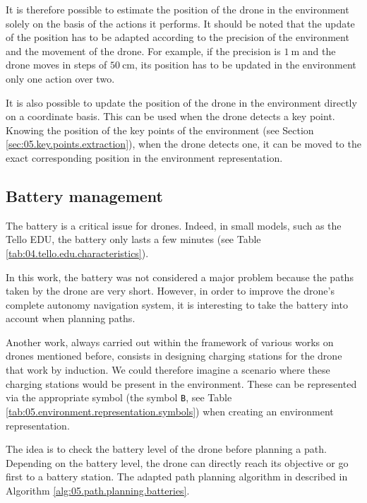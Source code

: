 It is therefore possible to estimate the position of the drone in the environment solely on the basis of the actions it performs. It should be noted that the update of the position has to be adapted according to the precision of the environment and the movement of the drone. For example, if the precision is $\SI{1}{\meter}$ and the drone moves in steps of $\SI{50}{\centi\meter}$, its position has to be updated in the environment only one action over two.

It is also possible to update the position of the drone in the environment directly on a coordinate basis. This can be used when the drone detects a key point. Knowing the position of the key points of the environment (see Section \ref{sec:05.key.points.extraction}), when the drone detects one, it can be moved to the exact corresponding position in the environment representation.

\subsection{Battery management}\label{sec:05.battery.management}

The battery is a critical issue for drones. Indeed, in small models, such as the Tello EDU, the battery only lasts a few minutes (see Table \ref{tab:04.tello.edu.characteristics}).

In this work, the battery was not considered a major problem because the paths taken by the drone are very short. However, in order to improve the drone's complete autonomy navigation system, it is interesting to take the battery into account when planning paths.

Another work, always carried out within the framework of various works on drones mentioned before, consists in designing charging stations for the drone that work by induction. We could therefore imagine a scenario where these charging stations would be present in the environment. These can be represented via the appropriate symbol (the symbol \texttt{B}, see Table \ref{tab:05.environment.representation.symbols}) when creating an environment representation.

The idea is to check the battery level of the drone before planning a path. Depending on the battery level, the drone can directly reach its objective or go first to a battery station. The adapted path planning algorithm in described in Algorithm \ref{alg:05.path.planning.batteries}.

